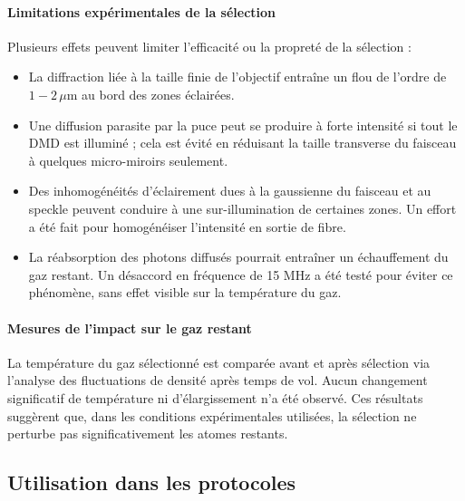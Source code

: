 \paragraph{Limitations expérimentales de la sélection}

Plusieurs effets peuvent limiter l'efficacité ou la propreté de la sélection :
\begin{itemize}[label = $\bullet$]
    \item La diffraction liée à la taille finie de l’objectif entraîne un flou de l’ordre de \(1{-}2\,\mu\)m au bord des zones éclairées.
    \item Une diffusion parasite par la puce peut se produire à forte intensité si tout le \gls*{DMD} est illuminé ; cela est évité en réduisant la taille transverse du faisceau à quelques micro-miroirs seulement.
    \item Des inhomogénéités d’éclairement dues à la gaussienne du faisceau et au speckle peuvent conduire à une sur-illumination de certaines zones. Un effort a été fait pour homogénéiser l’intensité en sortie de fibre.
    \item La réabsorption des photons diffusés pourrait entraîner un échauffement du gaz restant. Un désaccord en fréquence de 15 MHz a été testé pour éviter ce phénomène, sans effet visible sur la température du gaz.
\end{itemize}

\paragraph{Mesures de l’impact sur le gaz restant}

La température du gaz sélectionné est comparée avant et après sélection via l’analyse des fluctuations de densité après temps de vol. Aucun changement significatif de température ni d’élargissement n’a été observé. Ces résultats suggèrent que, dans les conditions expérimentales utilisées, la sélection ne perturbe pas significativement les atomes restants.




\subsection{Utilisation dans les protocoles}


